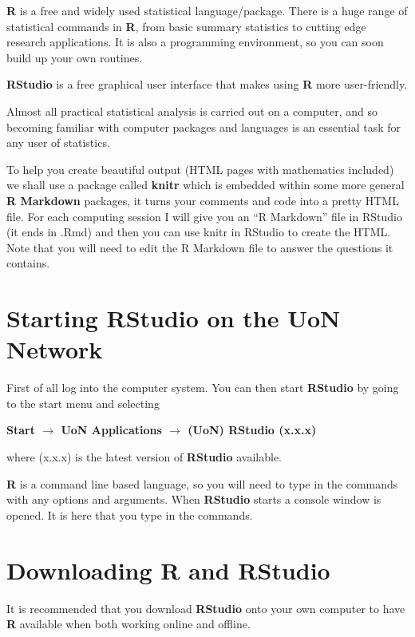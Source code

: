 \documentclass[
]{book}
\begin{document}
\textbf{R} is a free and widely used statistical language/package. There is a huge range of statistical commands in \textbf{R}, from basic summary statistics to cutting edge research applications. It is also a programming environment, so you can soon build up your own routines.

\textbf{RStudio} is a free graphical user interface that makes using \textbf{R} more user-friendly.

Almost all practical statistical analysis is carried out on a computer, and so becoming familiar with computer packages and languages is an essential task for any user of statistics.

To help you create beautiful output (HTML pages with mathematics included) we shall use a package called \textbf{knitr} which is embedded within some more general \textbf{R Markdown} packages, it turns your comments and code into a pretty HTML file. For each computing session I will give you an ``R Markdown'' file in RStudio (it ends in .Rmd) and then you can use knitr in RStudio to create the HTML. Note that you will need to edit the R Markdown file to answer the questions it contains.

\hypertarget{introR_UoN}{%
\section{Starting RStudio on the UoN Network}\label{introR_UoN}}

First of all log into the computer system. You can then start \textbf{RStudio} by going to the
start menu and selecting

\textbf{Start \(\rightarrow\) UoN Applications \(\rightarrow\) (UoN) RStudio (x.x.x)}

where (x.x.x) is the latest version of \textbf{RStudio} available.

\textbf{R} is a command line based language, so you will need to type in the commands with any options and arguments. When \textbf{RStudio} starts a console window is opened. It is here that you type in the commands.

\hypertarget{introR_download}{%
\section{Downloading R and RStudio}\label{introR_download}}

It is recommended that you download \textbf{RStudio} onto your own computer to have \textbf{R} available when both working online and offline.
\end{document}
